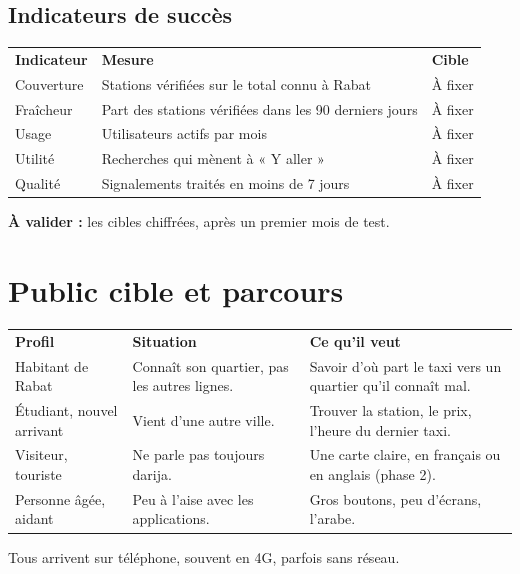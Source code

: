 \documentclass[11pt,a4paper]{article}
\newcommand{\hd}[1]{\textbf{\color{white}#1}}
\newcommand{\hdrow}{\rowcolor{brand}}
\newcommand{\valider}[1]{\begin{avalider}\textbf{À valider :} #1\end{avalider}}
\begin{document}
\subsection{Indicateurs de succès}
\begin{xltabular}{\textwidth}{@{}l Y l@{}}
\hdrow \hd{Indicateur} & \hd{Mesure} & \hd{Cible} \\
Couverture & Stations vérifiées sur le total connu à Rabat & À fixer \\
Fraîcheur & Part des stations vérifiées dans les 90 derniers jours & À fixer \\
Usage & Utilisateurs actifs par mois & À fixer \\
Utilité & Recherches qui mènent à « Y aller » & À fixer \\
Qualité & Signalements traités en moins de 7 jours & À fixer \\
\end{xltabular}
\valider{les cibles chiffrées, après un premier mois de test.}

\Needspace{8cm}
\section{Public cible et parcours}

\begin{xltabular}{\textwidth}{@{}l Y Y@{}}
\hdrow \hd{Profil} & \hd{Situation} & \hd{Ce qu'il veut} \\
Habitant de Rabat & Connaît son quartier, pas les autres lignes. & Savoir d'où part le taxi vers un quartier qu'il connaît mal. \\
Étudiant, nouvel arrivant & Vient d'une autre ville. & Trouver la station, le prix, l'heure du dernier taxi. \\
Visiteur, touriste & Ne parle pas toujours darija. & Une carte claire, en français ou en anglais (phase 2). \\
Personne âgée, aidant & Peu à l'aise avec les applications. & Gros boutons, peu d'écrans, l'arabe. \\
\end{xltabular}

Tous arrivent sur téléphone, souvent en 4G, parfois sans réseau.
\end{document}
